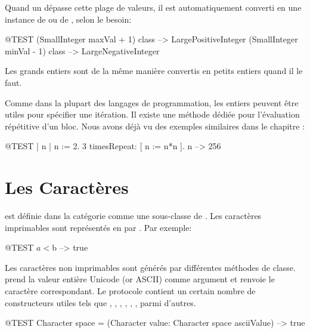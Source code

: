 \documentclass[a4paper,10pt,twoside]{book}
\begin{document}
Quand un  d\'epasse cette plage de valeurs, il est automatiquement converti en une instance de  ou de , selon le besoin:

\begin{code}{@TEST}
(SmallInteger maxVal + 1) class --> LargePositiveInteger
(SmallInteger minVal - 1) class  --> LargeNegativeInteger
\end{code}

Les grands entiers sont de la m\^eme mani\`ere convertis en petits entiers quand il le faut.

Comme dans la plupart des langages de programmation, les entiers peuvent \^etre utiles pour sp\'ecifier une it\'eration.  Il existe une m\'ethode d\'edi\'ee  pour l'\'evaluation r\'ep\'etitive d'un bloc.
Nous avons d\'ej\`a vu des exemples similaires dans le chapitre :
\begin{code}{@TEST | n |}
n := 2.
3 timesRepeat: [ n := n*n ].
n --> 256
\end{code}

\section{Les Caract\`eres}

 est d\'efinie dans la cat\'egorie  comme une sous-classe de . Les caract\`eres imprimables sont repr\'esent\'es en \squeak par .  Par exemple:

\begin{code}{@TEST}
$a < $b --> true
\end{code}

Les caract\`eres non imprimables sont g\'en\'er\'es par diff\'erentes m\'ethodes de classe. \mbox{} prend la valeur enti\`ere Unicode (or ASCII) comme argument et renvoie le caract\`ere correspondant. Le protocole  contient un certain nombre de constructeurs utiles tels que , , , , , , parmi d'autres.

\begin{code}{@TEST}
Character space = (Character value: Character space asciiValue) --> true
\end{code}
\end{document}
